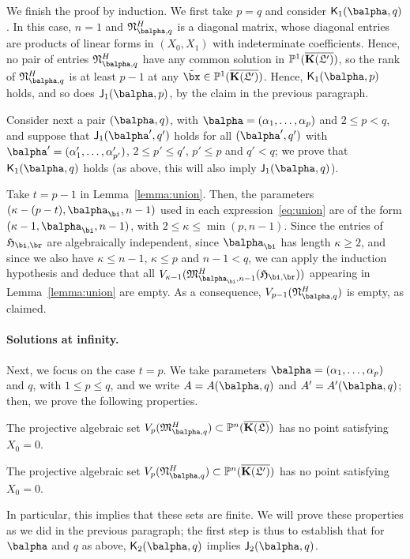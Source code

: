 \documentclass[12pt]{article}
\begin{document}
We finish the proof by induction. We first take $p=q$ and consider
$\assJ_1(\balpha,q)$.  In this case, $n=1$ and
$\mathfrak{N}^H_{\balpha,q}$ is a diagonal matrix, whose diagonal
entries are products of linear forms in $(X_0,X_1)$ with indeterminate
coefficients. Hence, no pair of entries $\mathfrak{N}^H_{\balpha,q}$
have any common solution in $\mathbb{P}^1(\overline{\mathbf{K}(\mathfrak{L}')})$, so the rank of
$\mathfrak{N}^H_{\balpha,q}$ is at least $p-1$ at any $\tilde\bx \in
\P^1(\KKGpbar)$. Hence, $\assJ_1(\balpha,p)$ holds, and so does
$\assI_1(\balpha,p)$, by the claim in the previous paragraph.

Consider next a pair $(\balpha,q)$, with
$\balpha=(\alpha_1,\dots,\alpha_p)$ and $2 \le p < q$, and suppose
that $\assI_1(\balpha',q')$ holds for all $(\balpha',q')$ with
$\balpha'=(\alpha'_1,\dots,\alpha'_{p'})$, $2 \le p' \le q'$, $p' \le p$ and $q'
< q$; we prove that $\assJ_1(\balpha,q)$ holds (as above, this will
also imply $\assI_1(\balpha,q)$).

Take $t=p-1$ in Lemma~\ref{lemma:union}. Then, the parameters
$(\kappa-(p-t),\balpha_\bi,n-1)$ used in each
expression~\eqref{eq:union} are of the form
$(\kappa-1,\balpha_\bi,n-1)$, with $2 \le \kappa \le \min(p,n-1)$.
Since the entries of $\mathfrak{H}_{\bi,\br}$ are algebraically
independent, since $\balpha_\bi$ has length $\kappa\ge 2$, and since we also
have $\kappa \le n-1$, $\kappa \le p$ and $n-1 < q$, we can apply the
induction hypothesis and deduce that all
$V_{\kappa-1}(\mathfrak{M}^H_{\balpha_\bi,n-1}(\mathfrak{H}_{\bi,\br}))$ appearing
in Lemma~\ref{lemma:union} are empty. As a consequence,
$V_{p-1}(\mathfrak{N}^H_{\balpha,q})$ is empty, as claimed.


\paragraph{Solutions at infinity.} Next, we focus on the case $t=p$.
We take parameters $\balpha=(\alpha_1,\dots,\alpha_p)$ and $q$, with
$1 \le p \le q$, and we write $A=A(\balpha,q)$ and $A'=A'(\balpha,q)$;
then, we prove the following properties.
\begin{description}[leftmargin=*]
\item[$\assI_2(\balpha,q).$] The projective algebraic set
  $V_p(\mathfrak{M}^H_{\balpha,q}) \subset \P^n(\KKGbar)$ has no point
  satisfying $X_0=0$.
\item[$\assJ_2(\balpha,q).$] The projective algebraic set
  $V_p(\mathfrak{N}^H_{\balpha,q}) \subset \P^n(\KKGpbar)$ has no point
  satisfying $X_0=0$.
\end{description}
In particular, this implies that these sets are finite. We will prove
these properties as we did in the previous paragraph; the first step
is thus to establish that for $\balpha$ and $q$ as above,
$\assJ_2(\balpha,q)$ implies $\assI_2(\balpha,q)$.
\end{document}
